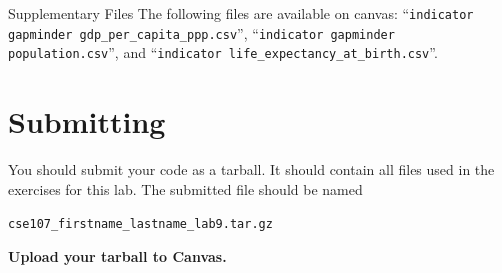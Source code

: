\documentclass[11pt]{cselabheader}
\begin{document}
\begin{infobox}{Supplementary Files}
The following files are available on canvas:
``\texttt{indicator gapminder gdp\_per\_capita\_ppp.csv}'',
``\texttt{indicator gapminder population.csv}'',
and ``\texttt{indicator life\_expectancy\_at\_birth.csv}''.
\end{infobox}


\newpage
\section{Submitting}

You should submit your code as a tarball. It should contain all files
used in the exercises for this lab. The submitted file should be named
\begin{center}
  \texttt{cse107\_firstname\_lastname\_lab9.tar.gz}
\end{center}

\begin{center}
  \textbf{Upload your tarball to Canvas.}
\end{center}

\listofexercises
\listofextraexercises
\end{document}
